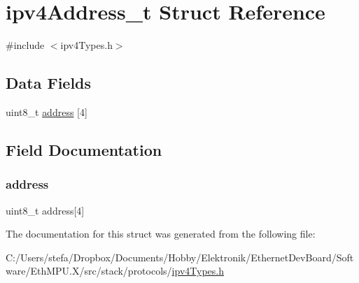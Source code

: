 \hypertarget{structipv4_address__t}{}\section{ipv4\+Address\+\_\+t Struct Reference}
\label{structipv4_address__t}


{\ttfamily \#include $<$ipv4\+Types.\+h$>$}

\subsection*{Data Fields}
\begin{DoxyCompactItemize}
\item 
uint8\+\_\+t \mbox{\hyperlink{structipv4_address__t_addf23a7962e43c9ba2ed54c76bd937d3}{address}} \mbox{[}4\mbox{]}
\end{DoxyCompactItemize}


\subsection{Field Documentation}
\mbox{\label{structipv4_address__t_addf23a7962e43c9ba2ed54c76bd937d3}} 
\subsubsection{\texorpdfstring{address}{address}}
{\footnotesize\ttfamily uint8\+\_\+t address\mbox{[}4\mbox{]}}



The documentation for this struct was generated from the following file\+:\begin{DoxyCompactItemize}
\item 
C\+:/\+Users/stefa/\+Dropbox/\+Documents/\+Hobby/\+Elektronik/\+Ethernet\+Dev\+Board/\+Software/\+Eth\+M\+P\+U.\+X/src/stack/protocols/\mbox{\hyperlink{ipv4_types_8h}{ipv4\+Types.\+h}}\end{DoxyCompactItemize}
